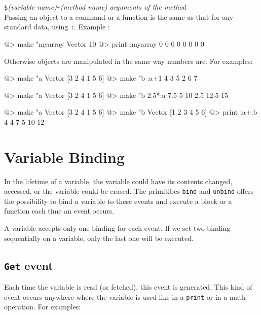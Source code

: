 {\tt \$}{\it (variable name)}{\tt \verb+~+}{\it (method name)} {\it arguments of the method}\\

Passing an object to a command or a function is the same as that for any standard data, using {\tt :}. Example :

\begin{verbatimtab}  
@> make "myarray Vector 10
@> print :myarray
0 0 0 0 0 0 0 0
\end{verbatimtab}

Otherwise objects are manipulated in the same way numbers are.  For examples:

\begin{verbatimtab}  
@> make "a Vector [3 2 4 1 5 6]
@> make "b :a+1
4 3 5 2 6 7
\end{verbatimtab}

\begin{verbatimtab}  
@> make "a Vector [3 2 4 1 5 6]
@> make "b 2.5*:a
7.5 5 10 2.5 12.5 15
\end{verbatimtab}

\begin{verbatimtab}  
@> make "a Vector [3 2 4 1 5 6] 
@> make "b Vector [1 2 3 4 5 6]
@> print :a+:b
4 4 7 5 10 12
\end{verbatimtab}

\section{Variable Binding}

In the lifetime of a variable, the variable could have its contents changed, accessed, or the variable could be erased. The primitibes {\tt bind} and {\tt unbind} offers the possibility to bind a variable to these events and execute a block or a function each time an event occurs.

A variable accepts only one binding for each event. If we set two binding sequentially on a variable, only the last one will be executed.

\subsection{{\tt Get} event}

Each time the variable is read (or fetched), this event is generated. This kind of event occurs anywhere where the variable is used like in a {\tt print} or in a math operation.  For examples:

